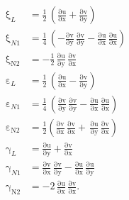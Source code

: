 \begin{subequations}
	\begin{align}
	\mathrm \xi_{L} & = \frac{1}{2} \, \left(\mathrm{\frac{\partial u}{\partial x}} + \mathrm{\frac{\partial v}{\partial y}}\right)\\
	\mathrm \xi_{N1} & = \frac{1}{4} \, \left(- \mathrm{\frac{ \partial v}{\partial y}}\, \mathrm{\frac{ \partial v}{\partial y}} -\mathrm{\frac{\partial u}{\partial x}}\, \mathrm{\frac{\partial u}{\partial x}}\right)\\
	\mathrm{\xi_{N2}} & = - \frac{1}{2} \, \mathrm{\frac{\partial u}{\partial y}}\, \mathrm{\frac{\partial v}{\partial x}}\\
	\mathrm \varepsilon_{L} & = \frac{1}{2} \, \left(\mathrm{\frac{\partial u}{\partial x}} - \mathrm{\frac{\partial v}{\partial y}}\right)\\
	\mathrm \varepsilon_{N1} & = \frac{1}{4} \, \left(\mathrm{\frac{ \partial v}{\partial y}}\, \mathrm{\frac{ \partial v}{\partial y}} -\mathrm{\frac{\partial u}{\partial x}}\, \mathrm{\frac{\partial u}{\partial x}} \right)\\
	\mathrm{\varepsilon_{N2}} & = \frac{1}{2} \left(\mathrm{\frac{\partial v}{\partial x}}\, \mathrm{\frac{\partial v}{\partial x}} + \, \mathrm{\frac{\partial u}{\partial y}}\, \mathrm{\frac{\partial v}{\partial x}} \right)\\
	\mathrm \gamma_{L} & = \mathrm{\frac{\partial u}{\partial y}} + \mathrm{\frac{\partial v}{\partial x}}\\
	\mathrm \gamma_{N1} & = \mathrm{\frac{\partial v}{\partial x}}\, \mathrm{\frac{\partial v}{\partial y}}-\mathrm{\frac{\partial u}{\partial x}}\, \mathrm{\frac{\partial u}{\partial y}}\\
	\mathrm{\gamma_{N2}} & =  - 2\, \mathrm{\frac{ \partial u}{\partial x}}\, \mathrm{\frac{ \partial v}{\partial x}}.  
	\end{align}
\end{subequations}
